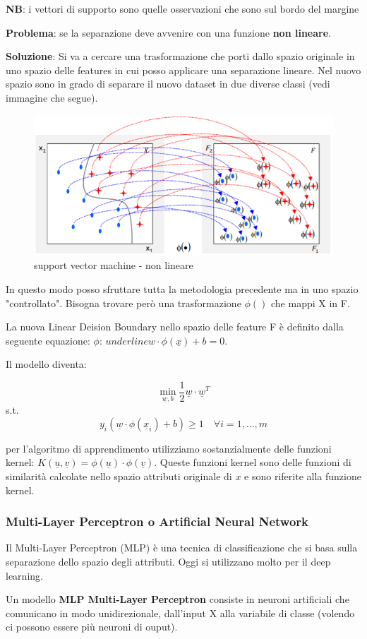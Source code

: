 \textbf{NB}: i vettori di supporto sono quelle osservazioni che sono sul bordo del margine

\textbf{Problema}: se la separazione deve avvenire con una funzione \textbf{non lineare}.
 
\textbf{Soluzione}: Si va a cercare una trasformazione che porti dallo spazio originale in uno spazio delle features in cui posso applicare una separazione lineare. Nel nuovo spazio sono in grado di separare il nuovo dataset in due diverse classi (vedi immagine che segue). 

\begin{figure}[H]
	\hspace{-0.5cm}
	\includegraphics[height=0.45 \linewidth]{classification/pict/svm_nonlinear.png}
	\caption{support vector machine - non lineare}
\end{figure}

In questo modo posso sfruttare tutta la metodologia precedente ma in uno spazio "controllato". Bisogna trovare però una trasformazione $\phi()$ che mappi X in F.

La nuova Linear Deision Boundary nello spazio delle feature F è definito dalla seguente equazione: $\phi$: $underline{w} \cdot \phi(\underline{x}) + b = 0$. 

Il modello diventa:

\[ \min_{\underline{w},b} \frac{1}{2}\underline{w} \cdot \underline{w}^T \]
\qquad s.t.
\[ y_i (\underline{w} \cdot \phi(\underline{x}_i) + b) \ge 1 \quad \forall i = 1, ..., m\]

per l'algoritmo di apprendimento utilizziamo sostanzialmente delle funzioni kernel: $K(\underline{u}, \underline{v}) = \phi(\underline{u}) \cdot \phi(\underline{v})$. Queste funzioni kernel sono delle funzioni di similarit\`a calcolate nello spazio attributi originale di $x$ e sono riferite alla funzione kernel.

\subsubsection{Multi-Layer Perceptron o Artificial Neural Network}
Il Multi-Layer Perceptron (MLP) è una tecnica di classificazione che si basa sulla separazione dello spazio degli attributi. Oggi si utilizzano molto per il deep learning.
\begin{defn}
	Un modello \textbf{MLP Multi-Layer Perceptron} consiste in neuroni artificiali che comunicano in modo unidirezionale, dall'input X alla variabile di classe (volendo ci possono essere pi\`u neuroni di ouput).
\end{defn}

